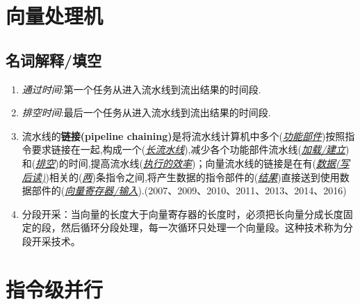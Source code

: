 \documentclass[a4paper]{ctexart}
\newcommand{\blank}[1]{(\emph{\underline{#1}})}
\begin{document}
\newpage
\section{向量处理机}
\subsection{名词解释/填空}
\begin{enumerate}
  \item \emph{通过时间}:第一个任务从进入流水线到流出结果的时间段.
  \item \emph{排空时间}:最后一个任务从进入流水线到流出结果的时间段.
  \item 流水线的\textbf{链接(pipeline chaining)}是将流水线计算机中多个(\emph{\underline{功能部件}})按照指令要求链接在一起,构成一个\blank{长流水线},减少各个功能部件流水线(\emph{\underline{加载/建立}})和\blank{排空}的时间,提高流水线\blank{执行的效率}；向量流水线的链接是在有\blank{数据(写后读)}相关的\blank{两}条指令之间,将产生数据的指令部件的\blank{结果}直接送到使用数据部件的\blank{向量寄存器/输入}.(2007、2009、2010、2011、2013、2014、2016)
  \item 分段开采：当向量的长度大于向量寄存器的长度时，必须把长向量分成长度固定的段，然后循环分段处理，每一次循环只处理一个向量段。这种技术称为分段开采技术。      
\end{enumerate}
\newpage
\section{指令级并行}
\end{document}
